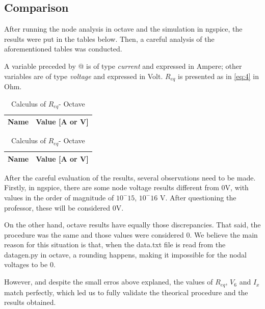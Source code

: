 \subsection{Comparison}
After running the node analysis in octave and the simulation in ngspice, the results were put in the tables below. Then, a careful analysis of the aforementioned tables was conducted.

A variable preceded by @ is of type {\em current} and expressed in Ampere; other variables are of type {\it voltage} and expressed in
    Volt. $R_{eq}$ is presented as in \ref{eq:4} in Ohm.

\begin{table}[ht]
\parbox{.30\linewidth}{
  \centering
  \begin{tabular}{|l|r|}
    \hline    
    {\bf Name} & {\bf Value [A or V]} \\ \hline
    
  \end{tabular}
  \caption{Simulation and Calculus of Req (NgSpice)}} 
\parbox{.30\linewidth}{
  \centering
  \begin{tabular}{|l|r|}
    \hline    
    {\bf Name} & {\bf Value [A or V]} \\ \hline
    
  \end{tabular}
  \caption{Calculus of $R_{eq}$- Octave}}
 
\end{table}

\par After the careful evaluation of the results, several observations need to be made. Firstly, in ngspice, there are some node voltage results different from 0V, with  values  in the order of magnitude of $10^-15$, $10^-16$ V. After questioning the professor, these will be considered 0V.

\par On the other hand, octave results have equally those discrepancies. That said, the procedure was the same and those values were considered 0. We believe the main reason for this situation is that, when the data.txt file is read from the datagen.py in octave, a rounding happens, making it impossible for the nodal voltages to be 0. 

\par However, and despite the small erros above explaned, the values of $R_{eq}$, $V_{6}$ and $I_{x}$ match perfectly, which led us to fully validate the theorical procedure and the results obtained.

\newpage


 

